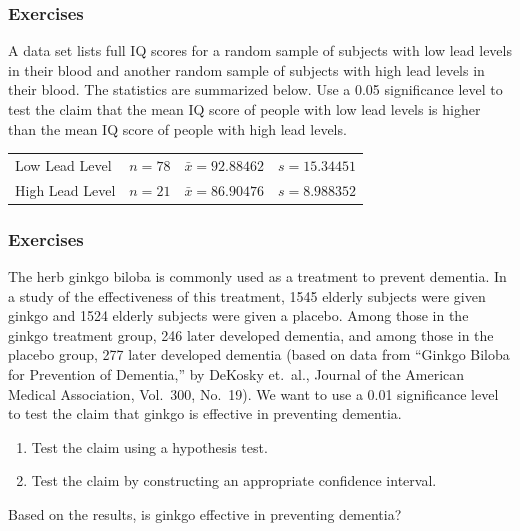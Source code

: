 \documentclass[xcolor=dvipsnames]{beamer}
\begin{document}
\begin{frame}
  \frametitle{Exercises}
{\ubung} A data set lists full IQ scores for
a random sample of subjects with low lead levels in their blood
and another random sample of subjects with high lead levels in
their blood. The statistics are summarized below. Use a 0.05
significance level to test the claim that the mean IQ score of
people with low lead levels is higher than the mean IQ score of
people with high lead levels.

\medskip

\begin{tabular}{llll}
  Low Lead Level & $n=78$ & $\bar{x}=92.88462$ & $s=15.34451$ \\ 
  High Lead Level & $n=21$ & $\bar{x}=86.90476$ & $s=8.988352$ \\
\end{tabular}
\end{frame}




\begin{frame}
  \frametitle{Exercises}
{\ubung} The herb ginkgo biloba is commonly used
as a treatment to prevent dementia. In a study of the effectiveness of
this treatment, 1545 elderly subjects were given ginkgo and 1524
elderly subjects were given a placebo. Among those in the ginkgo
treatment group, 246 later developed dementia, and among those in the
placebo group, 277 later developed dementia (based on data from
``Ginkgo Biloba for Prevention of Dementia,'' by DeKosky et.\ al., Journal
of the American Medical Association, Vol.\ 300, No.\ 19). We want to use
a 0.01 significance level to test the claim that ginkgo is effective
in preventing dementia.

\begin{enumerate}
\item Test the claim using a hypothesis test.
\item Test the claim by constructing an appropriate confidence interval.
\end{enumerate}

Based on the results, is ginkgo effective in preventing dementia?
\end{frame}
\end{document}
